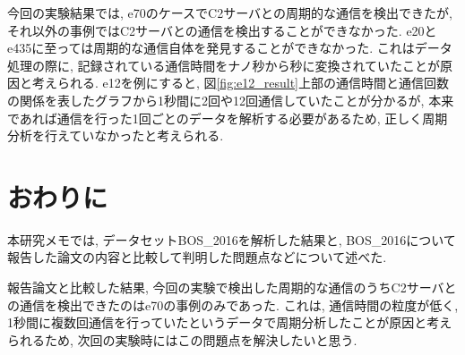 \documentclass[twocolumn,10pt]{ltjsarticle}
\begin{document}
今回の実験結果では, e70のケースでC2サーバとの周期的な通信を検出できたが, それ以外の事例ではC2サーバとの通信を検出することができなかった. e20とe435に至っては周期的な通信自体を発見することができなかった. これはデータ処理の際に, 記録されている通信時間をナノ秒から秒に変換されていたことが原因と考えられる. e12を例にすると, 図\ref{fig:e12_result}上部の通信時間と通信回数の関係を表したグラフから1秒間に2回や12回通信していたことが分かるが, 本来であれば通信を行った1回ごとのデータを解析する必要があるため, 正しく周期分析を行えていなかったと考えられる. 

\section{おわりに}
本研究メモでは, データセットBOS\_2016を解析した結果と, BOS\_2016について報告した論文の内容と比較して判明した問題点などについて述べた. 

報告論文と比較した結果, 今回の実験で検出した周期的な通信のうちC2サーバとの通信を検出できたのはe70の事例のみであった. これは, 通信時間の粒度が低く, 1秒間に複数回通信を行っていたというデータで周期分析したことが原因と考えられるため, 次回の実験時にはこの問題点を解決したいと思う. 



\end{document}
